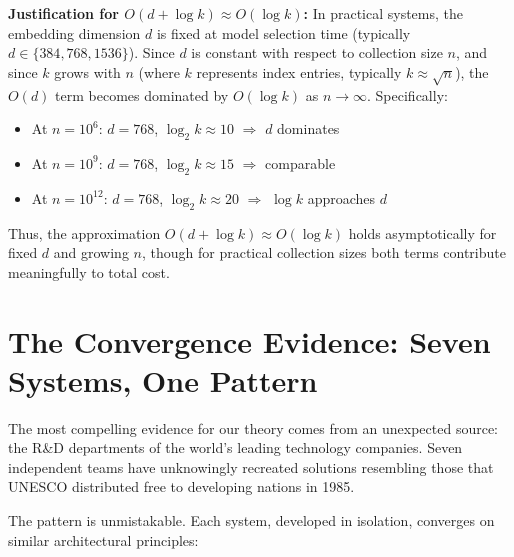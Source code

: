\documentclass[manuscript,screen,nonacm]{acmart}
\begin{document}
\textbf{Justification for $O(d + \log k) \approx O(\log k)$:} In practical systems, the embedding dimension $d$ is fixed at model selection time (typically $d \in \{384, 768, 1536\}$). Since $d$ is constant with respect to collection size $n$, and since $k$ grows with $n$ (where $k$ represents index entries, typically $k \approx \sqrt{n}$), the $O(d)$ term becomes dominated by $O(\log k)$ as $n \to \infty$. Specifically:
\begin{itemize}
    \item At $n = 10^6$: $d = 768$, $\log_2 k \approx 10$ $\Rightarrow$ $d$ dominates
    \item At $n = 10^9$: $d = 768$, $\log_2 k \approx 15$ $\Rightarrow$ comparable
    \item At $n = 10^{12}$: $d = 768$, $\log_2 k \approx 20$ $\Rightarrow$ $\log k$ approaches $d$
\end{itemize}

Thus, the approximation $O(d + \log k) \approx O(\log k)$ holds asymptotically for fixed $d$ and growing $n$, though for practical collection sizes both terms contribute meaningfully to total cost.

\section{The Convergence Evidence: Seven Systems, One Pattern}

The most compelling evidence for our theory comes from an unexpected source: the R\&D departments of the world's leading technology companies. Seven independent teams have unknowingly recreated solutions resembling those that UNESCO distributed free to developing nations in 1985.

The pattern is unmistakable. Each system, developed in isolation, converges on similar architectural principles:
\end{document}
